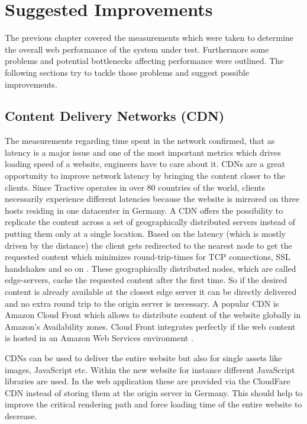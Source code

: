 \chapter{Suggested Improvements}
\label{chap:improvements}

The previous chapter covered the measurements which were taken to determine the overall web performance of the system under test. Furthermore some problems and potential bottlenecks affecting performance were outlined. The following sections try to tackle those problems and suggest possible improvements.

\section{Content Delivery Networks (CDN)}

The measurements regarding time spent in the network confirmed, that as latency is a major issue and one of the most important metrics which drives loading speed of a website, engineers have to care about it. CDNs are a great opportunity to improve network latency by bringing the content closer to the clients. Since Tractive operates in over 80 countries of the world, clients necessarily experience different latencies because the website is mirrored on three hosts residing in one datacenter in Germany. A CDN offers the possibility to replicate the content across a set of geographically distributed servers instead of putting them only at a single location. Based on the latency (which is mostly driven by the distance) the client gets redirected to the nearest node to get the requested content which minimizes round-trip-times for TCP connections, SSL handshakes and so on \cite{Google_2009}. These geographically distributed nodes, which are called edge-servers, cache the requested content after the first time. So if the desired content is already available at the closest edge server it can be directly delivered and no extra round trip to the origin server is necessary. A popular CDN is Amazon Cloud Front which allows to distribute content of the website globally in Amazon's Availability zones. Cloud Front integrates perfectly if the web content is hosted in an Amazon Web Services environment \cite{Amazon_2015}.

CDNs can be used to deliver the entire website but also for single assets like images, JavaScript etc. Within the new website for instance different JavaScript libraries are used. In the web application these are provided via the CloudFare CDN instead of storing them at the origin server in Germany. This should help to improve the critical rendering path and force loading time of the entire website to decrease.

